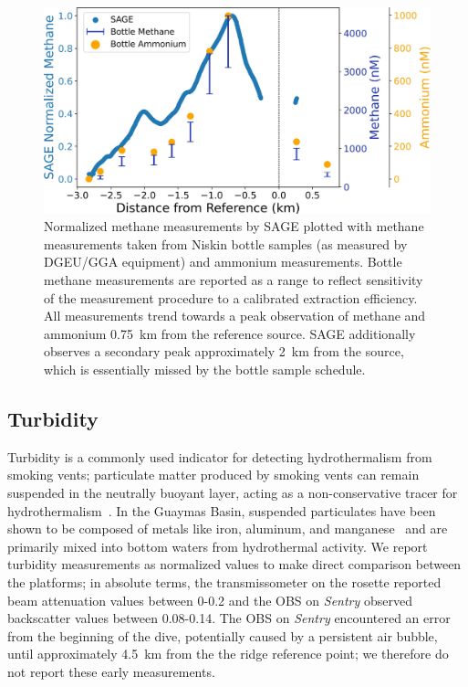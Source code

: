 \begin{figure}[h!]
    \centering
    \includegraphics[width=\columnwidth]{figures/chap3_bottle_norm.jpg}
    \caption[Methane observations compared to ammonium concentrations]{Normalized methane measurements by SAGE plotted with methane measurements taken from Niskin bottle samples (as measured by DGEU/GGA equipment) and ammonium measurements. Bottle methane measurements are reported as a range to reflect sensitivity of the measurement procedure to a calibrated extraction efficiency. All measurements trend towards a peak observation of methane and ammonium \SI{0.75}{\kilo\meter} from the reference source. SAGE additionally observes a secondary peak approximately \SI{2}{\kilo\meter} from the source, which is essentially missed by the bottle sample schedule.}
    \label{fig:bottles}
\end{figure}


\subsection{Turbidity}
\label{sec:turbidity_results}
Turbidity is a commonly used indicator for detecting hydrothermalism from smoking vents; particulate matter produced by smoking vents can remain suspended in the neutrally buoyant layer, acting as a non-conservative tracer for hydrothermalism~\autocite{feely1992tracking}. In the Guaymas Basin, suspended particulates have been shown to be composed of metals like iron, aluminum, and manganese~\autocite{scholz2019shelf} and are primarily mixed into bottom waters from hydrothermal activity. We report turbidity measurements as normalized values to make direct comparison between the platforms; in absolute terms, the transmissometer on the rosette reported beam attenuation values between 0-0.2 and the OBS on \emph{Sentry} observed backscatter values between 0.08-0.14. The OBS on \emph{Sentry} encountered an error from the beginning of the dive, potentially caused by a persistent air bubble, until approximately \SI{4.5}{\kilo\meter} from the the ridge reference point; we therefore do not report these early measurements. 

